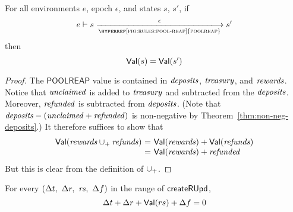 \begin{lemma}
  \label{lemma:poolreap-pres-of-value}
  For all environments $e$, epoch $\epsilon$, and states $s$, $s'$, if
  \begin{equation*}
    e\vdash s\trans{\hyperref[fig:rules:pool-reap]{poolreap}}{\epsilon}s'
  \end{equation*}
  then
  \begin{equation*}
    \mathsf{Val}(s) = \mathsf{Val}(s')
  \end{equation*}
\end{lemma}

\begin{proof}
  The $\mathsf{POOLREAP}$ value is contained in
  $\mathit{deposits}$, $\mathit{treasury}$, and $\mathit{rewards}$.
  Notice that $\mathit{unclaimed}$ is added to $\mathit{treasury}$
  and subtracted from the $\mathit{deposits}$.
  Moreover, $\mathit{refunded}$ is subtracted from $\mathit{deposits}$.
  (Note that $\mathit{deposits}-(\mathit{unclaimed}+\mathit{refunded})$
  is non-negative by Theorem~\ref{thm:non-neg-deposits}.)
  It therefore suffices to show that
  \begin{equation*}
    \begin{array}{r@{~=~}l}
    \Val(\var{rewards}\unionoverridePlus\var{refunds})
    & \Val(\var{rewards}) + \Val(\var{refunds})
    \\
    & \Val(\var{rewards}) + \var{refunded}
    \end{array}
  \end{equation*}
  But this is clear from the definition of $\mathbin{\cup_{+}}$.
\end{proof}

\begin{lemma}
  \label{lemma:ru-pres-of-value}
  For every $(\Delta t,~\Delta r,~\mathit{rs},~\Delta f)$ in the range of $\mathsf{createRUpd}$,
  \begin{equation*}
    \Delta t + \Delta r + \mathsf{Val}(rs) + \Delta f = 0
  \end{equation*}
\end{lemma}

